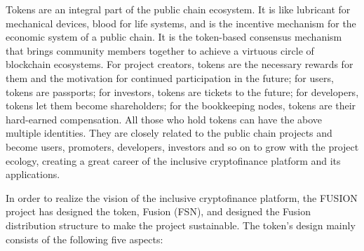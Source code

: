 \documentclass[a4paper,12pt]{article}
\begin{document}
Tokens are an integral part of the public chain ecosystem. It is like lubricant for mechanical devices, blood for life systems, and is the incentive mechanism for the economic system of a public chain. It is the token-based consensus mechanism that brings community members together to achieve a virtuous circle of blockchain ecosystems. For project creators, tokens are the necessary rewards for them and the motivation for continued participation in the future; for users, tokens are passports; for investors, tokens are tickets to the future; for developers, tokens let them become shareholders; for the bookkeeping nodes, tokens are their hard-earned compensation. All those who hold tokens can have the above multiple identities. They are closely related to the public chain projects and become users, promoters, developers, investors and so on to grow with the project ecology, creating a great career of the inclusive cryptofinance platform and its applications.

In order to realize the vision of the inclusive cryptofinance platform, the FUSION project has designed the token, Fusion (FSN), and designed the Fusion distribution structure to make the project sustainable. The token's design mainly consists of the following five aspects:
\end{document}
